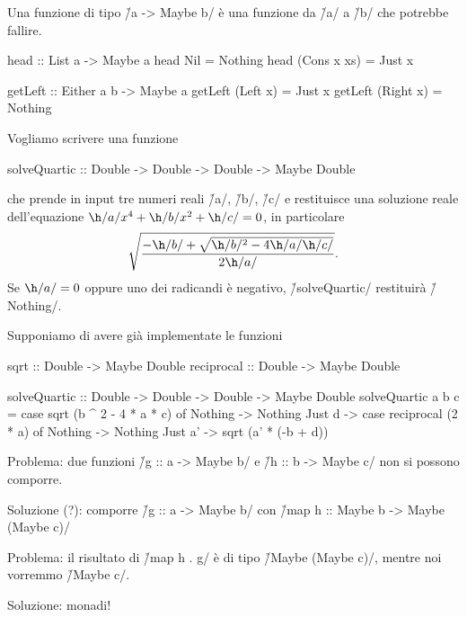 \begin{frame}[fragile]
Una funzione di tipo \h/a -> Maybe b/ è una funzione da \h/a/ a \h/b/ che potrebbe fallire.

\begin{haskellcode}
head :: List a -> Maybe a
head Nil = Nothing
head (Cons x xs) = Just x

getLeft :: Either a b -> Maybe a
getLeft (Left x) = Just x
getLeft (Right x) = Nothing
\end{haskellcode}
\end{frame}

\begin{frame}[fragile]
Vogliamo scrivere una funzione

\begin{haskellcode}
solveQuartic
    :: Double -> Double -> Double -> Maybe Double
\end{haskellcode}

che prende in input tre numeri reali \h/a/, \h/b/, \h/c/ e restituisce una soluzione reale dell'equazione $\h/a/x^4+\h/b/x^2+\h/c/=0$, in particolare
\[
\sqrt{\frac{-\h/b/+\sqrt{\h/b/^2-4\h/a/\h/c/}}{2\h/a/}}.
\]
Se $\h/a/=0$ oppure uno dei radicandi è negativo, \h/solveQuartic/ restituirà \h/Nothing/.
\end{frame}

\begin{frame}[fragile]
Supponiamo di avere già implementate le funzioni
\begin{haskellcode}
sqrt :: Double -> Maybe Double
reciprocal :: Double -> Maybe Double
\end{haskellcode}

\begin{haskellcode}
solveQuartic
    :: Double -> Double -> Double -> Maybe Double
solveQuartic a b c =
    case sqrt (b ^ 2 - 4 * a * c) of
        Nothing -> Nothing
        Just d -> case reciprocal (2 * a) of
            Nothing -> Nothing
            Just a' -> sqrt (a' * (-b + d))
\end{haskellcode}
\end{frame}

\begin{frame}[fragile]
Problema: due funzioni \h/g :: a -> Maybe b/ e \h/h :: b -> Maybe c/ non si possono comporre.

Soluzione (?): comporre \h/g :: a -> Maybe b/ con \h/map h :: Maybe b -> Maybe (Maybe c)/

Problema: il risultato di \h/map h . g/ è di tipo \h/Maybe (Maybe c)/, mentre noi vorremmo \h/Maybe c/.

Soluzione: monadi!
\end{frame}

